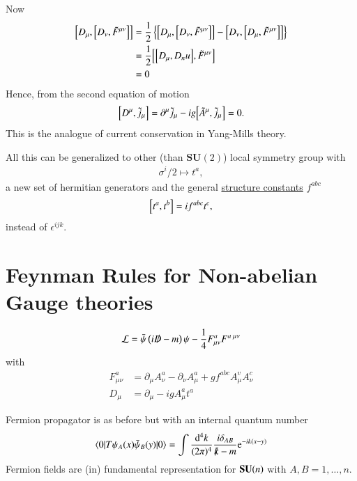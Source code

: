Now
\begin{align*}
   \comm{D_\mu}{\comm{D_\nu}{\tilde{F}^{\mu\nu}}} &= \frac{1}{2} \left\{ \comm{D_\mu}{\comm{D_\nu}{\tilde{F}^{\mu\nu}}}  - \comm{D_\nu}{\comm{D_\mu}{\tilde{F}^{\mu\nu}}}\right\} \\
                                                  &= \frac{1}{2} \comm{\comm{D_\mu}{D_nu}}{\tilde{F}^{\mu\nu}}  \\
                                                  &= 0
\end{align*}
Hence, from the second equation of motion
\begin{align}
   \comm{D^\mu}{\tilde{j}_\mu} = \partial^\mu \tilde{j}_\mu - ig \comm{\tilde{A}^\mu}{\tilde{j}_\mu} = 0.
\end{align}
This is the analogue of current conservation in Yang-Mills theory.

All this can be generalized to other (than $\mathbf{SU}(2)$) local symmetry group with 
\begin{align*}
   \sigma^i / 2 \mapsto t^a,
\end{align*}
a new set of hermitian generators and the general \underline{structure constants} $f^{abc}$
\begin{align}
   \comm{t^a}{t^b} = i f^{abc} t^c,
\end{align}
instead of $\epsilon^{ijk}$.

\section{Feynman Rules for Non-abelian Gauge theories}
\begin{align}
   \mathcal{L} = \bar{\psi} \left( i \slashed{D} - m \right)\psi - \frac{1}{4} F_{\mu\nu}^a F^{a\; \mu\nu}
\end{align}
with 
\begin{align*}
   F^a_{\mu\nu} &= \partial_\mu A_\nu^a - \partial_\nu A^a_\mu + g f^{abc} A_\mu^v A_\nu^c  \\
   D_\mu & = \partial_\mu - igA_\mu^a t^a
\end{align*}

Fermion propagator is as before but with an internal quantum number
\begin{align}
   \braket{0 | T \psi_A (x) \bar{\psi}_B(y) | 0} = \int \frac{\dd[4]{k}}{(2\pi)^4} \frac{i\delta_{AB}}{\slashed{k}-m} \mathrm{e}^{-ik(x-y)} 
\end{align}
Fermion fields are (in) fundamental representation for $\mathbf{SU}(n)$ with $A,B=1,\dots,n$.

